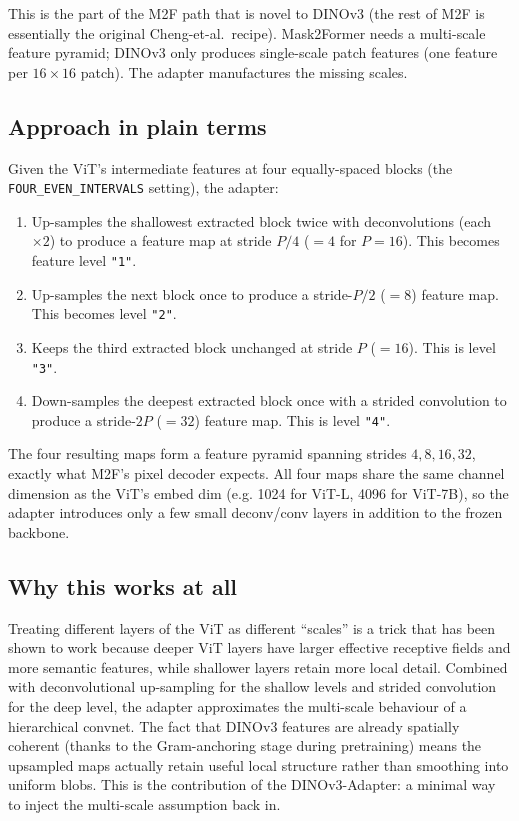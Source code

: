 \documentclass[11pt,a4paper]{article}
\begin{document}
This is the part of the M2F path that is novel to DINOv3 (the rest of M2F
is essentially the original Cheng-et-al.\ recipe). Mask2Former needs a
multi-scale feature pyramid; DINOv3 only produces single-scale patch
features (one feature per $16{\times}16$ patch). The adapter manufactures
the missing scales.

\subsection{Approach in plain terms}

Given the ViT's intermediate features at four equally-spaced blocks (the
\texttt{FOUR\_EVEN\_INTERVALS} setting), the adapter:
\begin{enumerate}[leftmargin=1.6em,itemsep=0pt]
  \item Up-samples the shallowest extracted block twice with deconvolutions
        (each $\times 2$) to produce a feature map at stride $P/4$
        ($= 4$ for $P{=}16$). This becomes feature level \texttt{"1"}.
  \item Up-samples the next block once to produce a stride-$P/2$
        ($= 8$) feature map. This becomes level \texttt{"2"}.
  \item Keeps the third extracted block unchanged at stride $P$
        ($= 16$). This is level \texttt{"3"}.
  \item Down-samples the deepest extracted block once with a strided
        convolution to produce a stride-$2P$ ($= 32$) feature map. This
        is level \texttt{"4"}.
\end{enumerate}
The four resulting maps form a feature pyramid spanning strides $4, 8,
16, 32$, exactly what M2F's pixel decoder expects. All four maps share
the same channel dimension as the ViT's embed dim (e.g. 1024 for ViT-L,
4096 for ViT-7B), so the adapter introduces only a few small
deconv/conv layers in addition to the frozen backbone.

\subsection{Why this works at all}

Treating different layers of the ViT as different ``scales'' is a trick
that has been shown to work because deeper ViT layers have larger
effective receptive fields and more semantic features, while shallower
layers retain more local detail. Combined with deconvolutional
up-sampling for the shallow levels and strided convolution for the deep
level, the adapter approximates the multi-scale behaviour of a
hierarchical convnet. The fact that DINOv3 features are already
spatially coherent (thanks to the Gram-anchoring stage during
pretraining) means the upsampled maps actually retain useful local
structure rather than smoothing into uniform blobs. This is the
contribution of the DINOv3-Adapter: a minimal way to inject the
multi-scale assumption back in.
\end{document}
